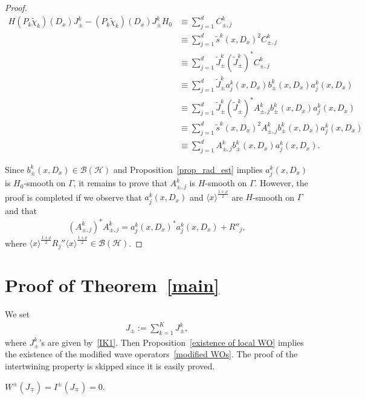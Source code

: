 \documentclass[10pt]{amsart}
\theoremstyle{definition}\newtheorem{defi}[theo]{Definition}\newtheorem{rema}[theo]{Remark}\newtheorem{exam}[theo]{Example}\newtheorem{exem}[theo]{Example}\newtheorem{nota}[theo]{Notation}
\newcommand{\HS}{\mathcal{H}}
\newcommand{\BS}{\mathcal{B}}
\newcommand{\jap}[1]{\langle #1 \rangle}
\begin{document}
\begin{proof}
\begin{align*}
H (P_k \tilde\chi_k)(D_x)J_\pm^k - (P_k \tilde\chi_k)(D_x)J_\pm^k H_0 
&\equiv \sum_{j=1}^d C_{\pm,j}^k \\
&\equiv \sum_{j=1}^d \tilde s^k(x,D_x)^2 C_{\pm,j}^k \\
&\equiv \sum_{j=1}^d \tilde J_\pm^k (\tilde J_\pm^k)^* C_{\pm,j}^k \\
&\equiv \sum_{j=1}^d \tilde J_\pm^k a_j^k(x,D_x) b_\pm^k(x,D_x) a_j^k(x,D_x) \\
&\equiv \sum_{j=1}^d \tilde J_\pm^k (\tilde J_\pm^k)^* A_{\pm,j}^k b_\pm^k(x,D_x) a_j^k(x,D_x) \\
&\equiv \sum_{j=1}^d \tilde s^k(x,D_x)^2 A_{\pm,j}^k b_\pm^k(x,D_x) a_j^k(x,D_x) \\
&\equiv \sum_{j=1}^d A_{\pm,j}^k b_\pm^k(x,D_x) a_j^k(x,D_x).
\end{align*}

Since $b_\pm^k(x,D_x) \in \BS(\HS)$ and Proposition~\ref{prop_rad_est} implies $a_j^k(x,D_x)$ is $H_0$-smooth on $\Gamma$, it remains to prove that $A_{\pm,j}^k$ is $H$-smooth on $\Gamma$. However, the proof is completed if we observe that $a_j^k(x,D_x)$ and $\jap{x}^{\frac{1+\rho}{2}}$ are $H$-smooth on $\Gamma$ and that
\begin{align*}
\left(A_{\pm,j}^k\right)^* A_{\pm,j}^k=a_j^k(x,D_x)^*a_j^k(x,D_x) + R''_j,
\end{align*}
where $\jap{x}^{\frac{1+\rho}{2}}R_j''\jap{x}^{\frac{1+\rho}{2}}\in\BS(\HS)$.
\end{proof}



\section{Proof of Theorem~\ref{main}} \label{proof section}


We set
\begin{align}\label{time-independent modifiers}
J_\pm := \sum_{k=1}^K J_\pm^k,
\end{align}
where $J_\pm^k$'s are given by~\eqref{IK1}. Then Proposition~\ref{existence of local WO} implies the existence of the modified wave operators~\eqref{modified WOs}. The proof of the intertwining property is skipped since it is easily proved.



\begin{prop}\label{nonstationary prop}
$W^\pm(J_\mp) = I^\pm(J_\mp) = 0$.
\end{prop}
\end{document}
